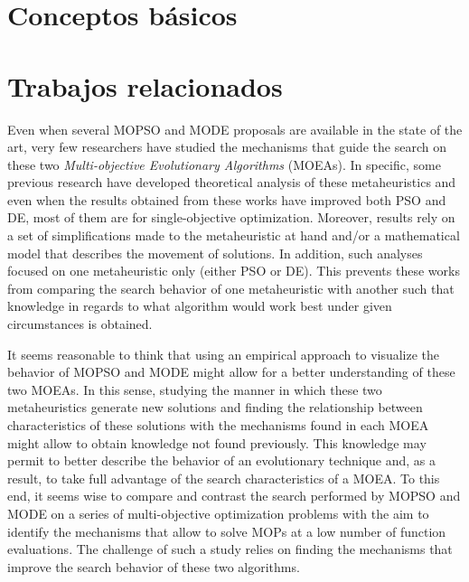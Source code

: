 \section{Conceptos básicos} \label{}

\section{Trabajos relacionados} \label{}
Even when several MOPSO and MODE proposals are available in the state of the art, very few researchers have studied the mechanisms that guide the search on these two \emph{Multi-objective Evolutionary Algorithms} (MOEAs). In specific, some previous research have developed theoretical analysis of these metaheuristics \cite{Vandenbergh2006,Clerc2002} and even when the results obtained from these works have improved both PSO and DE, most of them are for single-objective optimization. Moreover, results rely on a set of simplifications made to the metaheuristic at hand and/or a mathematical model that describes the movement of solutions. In addition, such analyses focused on one metaheuristic only (either PSO or DE). This prevents these works from comparing the search behavior of one metaheuristic with another such that knowledge in regards to what algorithm would work best under given circumstances is obtained. 

It seems reasonable to think that using an empirical approach to visualize the behavior of MOPSO and MODE might allow for a better understanding of these two MOEAs. In this sense, studying the manner in which these two metaheuristics generate new solutions and finding the relationship between characteristics of these solutions with the mechanisms found in each MOEA might allow to obtain knowledge not found previously. This knowledge may permit to better describe the behavior of an evolutionary technique and, as a result, to take full advantage of the search characteristics of a MOEA. To this end, it seems wise to compare and contrast the search performed by MOPSO and MODE on a series of multi-objective optimization problems with the aim to identify the mechanisms that allow to solve MOPs at a low number of function evaluations. The challenge of such a study relies on finding the mechanisms that improve the search behavior of these two algorithms.

